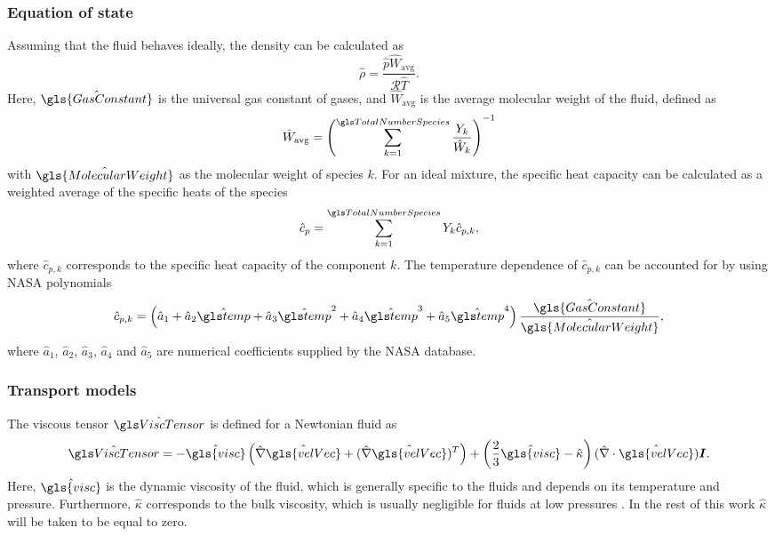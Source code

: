 \subsubsection{Equation of state}
Assuming that the fluid behaves ideally, the density can be calculated as
\begin{equation}
	\hat \rho = \frac{\hat{p}  \hat{W}_{\text{avg}}}{\mathcal{R} \hat{T} }. \label{eq:IdealGassDimensional}
\end{equation}
Here, $\hat{\gls{GasConstant}}$ is the universal gas constant of gases, and $\hat W_{\text{avg}}$ is the average molecular weight of the fluid, defined as
\begin{equation}
	\hat W_{\text{avg}} = \left( \SumOvAllns \frac{Y_k}{\hat W_k} \right)^{-1}
\end{equation}
with $\hat{\gls{MolecularWeight}}$ as the molecular weight of species $k$.  For an ideal mixture, the specific heat capacity can be calculated as a weighted average of the specific heats of the species 
\begin{equation}
	\hat c_p = \SumOvAllns Y_k \hat{c}_{p,k},%
\end{equation}
where $\hat{c}_{p,k}$ corresponds to the specific heat capacity of the component $k$. The temperature dependence of $\hat{c}_{p,k}$ can be accounted for by using NASA polynomials \parencite{mcbrideNASAThermodynamicData1993}
\begin{equation}
	\hat{c}_{p,k} = \left(\hat a_1 + \hat  a_2\glsHat{temp} +\hat  a_3\glsHat{temp}^2 +\hat  a_4\glsHat{temp}^3+\hat a_5\glsHat{temp}^4\right)\frac{\hat{\gls{GasConstant}}}{\hat{\gls{MolecularWeight}}},
\end{equation}
where $\hat a_1$, $\hat a_2$, $\hat a_3$, $\hat a_4$ and $\hat a_5$ are numerical coefficients supplied by the NASA database.
\subsubsection{Transport models}
The viscous tensor $\glsHat{ViscTensor}$ is defined for a Newtonian fluid as
\begin{equation}
	\glsHat{ViscTensor}= -\hat{\gls{visc}}\left( \hat\nabla \hat{\gls{velVec}} +(\hat\nabla\hat{\gls{velVec}})^T\right)  + \left(\frac{2}{3}\hat{\gls{visc}} - \hat \kappa \right) (\hat\nabla\cdot \hat{\gls{velVec}})\mytensor{I}.
\end{equation}
Here, $\hat{\gls{visc}}$ is the dynamic viscosity of the fluid, which is generally specific to the fluids and depends on its temperature and pressure. Furthermore, $\hat \kappa$ corresponds to the bulk viscosity, which is usually negligible for fluids at low pressures \parencite{birdTransportPhenomena1960}. In the rest of this work $\hat \kappa$ will be taken to be equal to zero.

